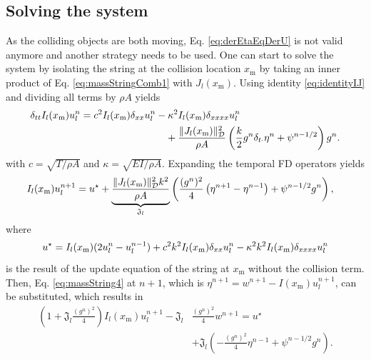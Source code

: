 \subsection{Solving the system}
As the colliding objects are both moving, Eq. \eqref{eq:derEtaEqDerU} is not valid anymore and another strategy needs to be used.
One can start to solve the system by isolating the string at the collision location $x_\text{m}$ by taking an inner product of Eq. \eqref{eq:massStringComb1} with $J_l(x_\text{m})$. Using identity \eqref{eq:identityIJ} and dividing all terms by $\rho A$ yields
\begin{align*}
    \delta_{tt}I_l(x_\text{m})u^n_l =c^2I_l(x_\text{m})\delta_{xx}u^n_l &- \kappa^2I_l(x_\text{m})\delta_{xxxx}u_l^n \\
    &\quad + \frac{\lVert J_l(x_\text{m})\rVert^2_{\mathcal{D}}}{\rho A} \left(\frac{k}{2}g^n\delta_{t\cdot}\eta^n + \psi^{n-1/2}\right)g^n.
\end{align*}
with $c = \sqrt{T/\rho A}$ and $\kappa = \sqrt{EI/\rho A}$. Expanding the temporal FD operators yields 
\begin{align*}
    I_l(x_\text{m})u_l^{n+1} &= u^\star+ \underbrace{\frac{\lVert J_l(x_\text{m})\rVert^2_{\mathcal{D}} k^2}{\rho A}}_{\mathfrak{J}_l} \left(\frac{(g^n)^2}{4}\left(\eta^{n+1}-\eta^{n-1}\right) + \psi^{n-1/2}g^n\right),
\end{align*}
where 
\begin{equation*}
    u^\star = I_l(x_\text{m})(2u_l^n -u_l^{n-1}) + c^2k^2I_l(x_\text{m})\delta_{xx}u_l^n- \kappa^2k^2I_l(x_\text{m})\delta_{xxxx}u_l^n
\end{equation*}
is the result of the update equation of the string at $x_\text{m}$ without the collision term. Then, Eq. \eqref{eq:massString4} at $n+1$, which is $\eta^{n+1} = w^{n+1} - I(x_\text{m})u_l^{n+1}$, can be substituted, which results in
\begin{equation}\label{eq:expandedMassString1}
    \begin{aligned}
    \left(1 + \mathfrak{J}_l\frac{(g^n)^2}{4}\right)I_l(x_\text{m})u_l^{n+1} - \mathfrak{J}_l&\frac{(g^n)^2}{4} w^{n+1}= u^\star\\
    & + \mathfrak{J}_l \left(-\frac{(g^n)^2}{4}\eta^{n-1} + \psi^{n-1/2}g^n\right).
    \end{aligned}
\end{equation}
    
